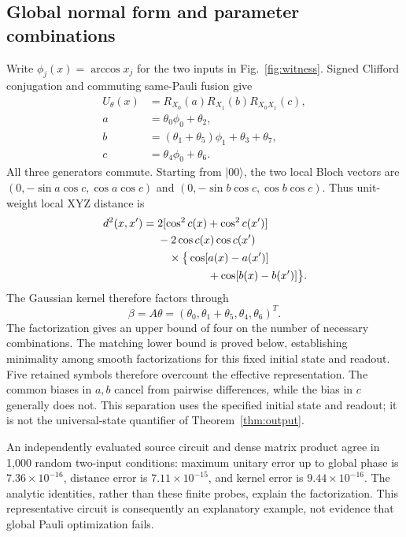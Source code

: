 \subsection{Global normal form and parameter combinations}
\label{sec:normalform}
Write $\phi_j(x)=\arccos x_j$ for the two inputs in Fig.~\ref{fig:witness}.
Signed Clifford conjugation and commuting same-Pauli fusion give
\begin{align}
 U_\theta(x)&=R_{X_0}(a)R_{X_1}(b)R_{X_0X_1}(c),\\
 a&=\theta_0\phi_0+\theta_2,\nonumber\\
 b&=(\theta_1+\theta_5)\phi_1+\theta_3+\theta_7,\nonumber\\
 c&=\theta_4\phi_0+\theta_6.\label{eq:normal}
\end{align}
All three generators commute. Starting from $|00\rangle$, the two local
Bloch vectors are $(0,-\sin a\cos c,\cos a\cos c)$ and
$(0,-\sin b\cos c,\cos b\cos c)$. Thus unit-weight local XYZ distance is
\begin{align}
 d^2(x,x')={}&2[\cos^2c(x)+\cos^2c(x')]\nonumber\\
 &-2\cos c(x)\cos c(x')\nonumber\\
 &\quad\times\big\{\cos[a(x)-a(x')]\nonumber\\
 &\hspace{16mm}+\cos[b(x)-b(x')]\big\}.\label{eq:closed}
\end{align}
The Gaussian kernel therefore factors through
\begin{equation}
 \beta=A\theta=(\theta_0,\theta_1+\theta_5,\theta_4,\theta_6)^T.
 \label{eq:beta}
\end{equation}
The factorization gives an upper bound of four on the number of necessary
combinations. The matching lower bound is proved below, establishing
minimality among smooth factorizations for this fixed initial state and
readout. Five retained symbols therefore overcount the effective
representation. The common biases in $a,b$
cancel from pairwise differences, while the bias in $c$ generally does
not. This separation uses the specified initial state and readout;
it is not the universal-state quantifier of Theorem~\ref{thm:output}.

An independently evaluated source circuit and dense matrix product
agree in 1,000 random two-input conditions: maximum unitary error up to
global phase is $7.36\times10^{-16}$, distance error is
$7.11\times10^{-15}$, and kernel error is $9.44\times10^{-16}$.
The analytic identities, rather than these finite probes, explain the
factorization. This representative circuit is consequently an
explanatory example, not evidence that global Pauli optimization fails.


